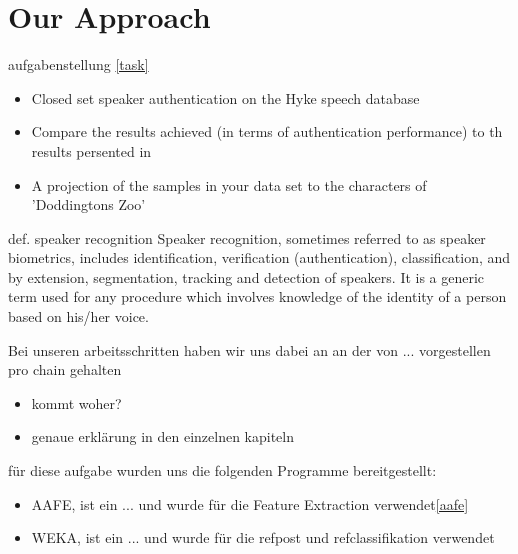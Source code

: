 \section{Our Approach}
\label{approach}


aufgabenstellung \ref{task}
\begin{itemize}
	\item Closed set speaker authentication on the Hyke speech database
	\item Compare the results achieved (in terms of authentication performance) to th results persented in \cite{hyke}
	\item A projection of the samples in your data set to the characters of 'Doddingtons Zoo' 
\end{itemize}

def. speaker recognition \cite{beigi}
Speaker recognition, sometimes referred to as speaker biometrics, includes identification, verification (authentication), classification, and by extension, segmentation,
tracking and detection of speakers. It is a generic term used for any procedure which
involves knowledge of the identity of a person based on his/her voice.

Bei unseren arbeitsschritten haben wir uns dabei an
an der von ... vorgestellen pro chain gehalten
\begin{itemize}
	\item kommt woher? \cite{dittmann}
	\item genaue erklärung in den einzelnen kapiteln
\end{itemize}


für diese aufgabe wurden uns die folgenden Programme bereitgestellt:

\begin{itemize}
	\item AAFE, ist ein ... und wurde für die Feature Extraction verwendet\ref{aafe}
	\item WEKA, ist ein ... und wurde für die ref{post} und ref{classifikation} verwendet
\end{itemize}

